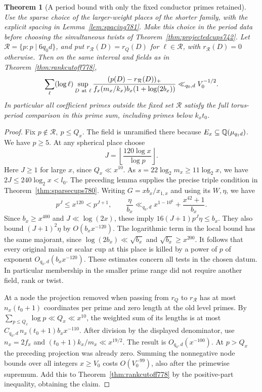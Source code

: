 \documentclass[a4paper,11pt]{article}
\newtheorem{theorem}[proposition]{Theorem}
\theoremstyle{definition}
\theoremstyle{remark}
\numberwithin{equation}{section}
\begin{document}
\begin{theorem}[A period bound with only the fixed conductor primes retained]
\leavevmode\label{thm:fixedconductor781}
Use the sparse choice of the larger-weight places of
the shorter family, with the explicit spacing in
Lemma~\ref{lem:spacing781}. Make this choice in the
period data before choosing the simultaneous twists of
Theorem~\ref{thm:projectedcups742}. Let
\(\mathcal R=\{p:p\mid 6q_0d\}\), and put
\(r_{\mathcal R}(D)=r_Q(D)\) for \(\ell\in\mathcal R\),
with \(r_{\mathcal R}(D)=0\) otherwise. Then on the
same interval and fields as in Theorem~\ref{thm:rankcutoff778},
\[
 \sum_\ell(\log\ell)\sup_{D\ {\rm at}\ \ell}
   \frac{(p(D)-r_{\mathcal R}(D))_+}
         {f_x(m_x/k_x)b_x(1+\log(2b_x))}
                \ll_{q_0,d} V_0^{-1/2}.
\]
In particular all coefficient primes outside the fixed
set \(\mathcal R\) satisfy the full torus-period comparison
in this prime sum, including primes below \(k_x t_0\).
\end{theorem}
\begin{proof}
Fix \(p\notin\mathcal R,\ p\le Q_x\). The field is
unramified there because \(E_x\subseteq\mathbb Q(\mu_{q_1d})\).
We have \(p\ge5\). At any spherical place choose
\[
               J=\left\lfloor\frac{120\log x}{\log p}
                                                    \right\rfloor .
\]
Here \(J\ge1\) for large \(x\), since \(Q_x\ll x^{10}\).
As \(s=22\log_2 m_x\ge11\log_2 x\), we have
\(2J\le240\log_2 x<l_0\). The preceding lemma supplies
the precise triple condition in Theorem~\ref{thm:sparsecups780}.
Writing \(G=xb_x/x_{1,x}\) and using its \(W,\eta\),
we have
\[
  p^J\le x^{120}<p^{J+1},\qquad
  \frac{\eta}{b_x}\ll_{q_0,d}
                  x^{1-10^6}+\frac{x^{42}+1}{b_x}.
\]
Since \(b_x\ge x^{400}\) and \(J\ll\log(2x)\), these imply
\(16(J+1)p^J\eta\le b_x\). They also bound
\((J+1)^2\eta\) by \(O(b_x x^{-120})\).
The logarithmic term in the local bound has the same
majorant, since \(\log(2b_x)\ll \sqrt{b_x}\) and
\(\sqrt{b_x}\ge x^{200}\). It follows that every
original main or scalar cup at this place is killed
by a power of \(p\) of exponent \(O_{q_0,d}(b_x x^{-120})\).
These estimates concern all tests in the chosen datum.
In particular membership in the smaller prime range did
not require another field, rank or twist.

At a node the projection removed when passing from
\(r_Q\) to \(r_{\mathcal R}\) has at most \(n_x(t_0+1)\)
coordinates per prime and zero length at the old level
primes. By \(\sum_{p\le Q_x}\log p\ll Q_x\ll x^{10}\),
the weighted sum of its lengths is at most
\(C_{q_0,d}\,n_x(t_0+1)b_x x^{-110}\).
After division by the displayed denominator, use
\(n_x=2f_x\) and \((t_0+1)k_x/m_x\ll x^{19/2}\).
The result is \(O_{q_0,d}(x^{-100})\). At \(p>Q_x\)
the preceding projection was already zero. Summing the
nonnegative node bounds over all integers \(x\ge V_0\)
costs \(O(V_0^{-99})\), also after the primewise
supremum. Add this to Theorem~\ref{thm:rankcutoff778}
by the positive-part inequality, obtaining the claim.
\end{proof}
\end{document}
